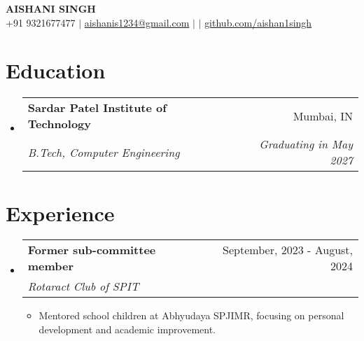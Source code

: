 \documentclass[letterpaper,11pt]{article}
\makeatletter
\newcommand{\resumeItem}[1]{\item\small{#1 \vspace{-2pt}}}
\newcommand{\resumeSubheading}[4]{
  \vspace{-2pt}\item
    \begin{tabular*}{0.97\textwidth}[t]{l@{\extracolsep{\fill}}r}
      \textbf{#1} & #2 \\
      \textit{\small#3} & \textit{\small#4} \\
    \end{tabular*}\vspace{-7pt}
}
\newcommand{\resumeItemListStart}{\begin{itemize}}
\newcommand{\resumeItemListEnd}{\end{itemize}\vspace{-5pt}}
\newcommand{\resumeSubHeadingListStart}{\begin{itemize}[leftmargin=0.15in, label={}]}
\newcommand{\resumeSubHeadingListEnd}{\end{itemize}}
\makeatother
\begin{document}
\begin{center}
  \textbf{\Huge \scshape AISHANI SINGH} \\ \vspace{1pt}
  \small +91 9321677477 $|$ \href{mailto:aishanis1234@gmail.com}{aishanis1234@gmail.com} $|$
  \href{}{} $|$
  \href{https://github.com/aishan1singh}{github.com/aishan1singh}
\end{center}

\section{Education}
\resumeSubHeadingListStart
  \resumeSubheading
    {Sardar Patel Institute of Technology}{Mumbai, IN}
    {B.Tech, Computer Engineering}{Graduating in May 2027}
\resumeSubHeadingListEnd

\section{Experience}
\resumeSubHeadingListStart
  \resumeSubheading
    {Former sub-committee member}{September, 2023 - August, 2024}
    {Rotaract Club of SPIT}{}
  \resumeItemListStart
    \resumeItem{Mentored school children at Abhyudaya SPJIMR, focusing on personal development and academic improvement.}
  \resumeItemListEnd
\resumeSubHeadingListEnd

\end{document}
